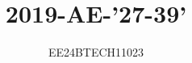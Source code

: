 \documentclass[journal,12pt,onecolumn]{IEEEtran}
\theoremstyle{remark}
\begin{document}

\vspace{3cm}


\title{2019-AE-'27-39'}
\author{EE24BTECH11023}

{\let\newpage\relax\maketitle}

\renewcommand{\thefigure}{\theenumi}
\renewcommand{\thetable}{\theenumi}
\setlength{\intextsep}{10pt} %


\renewcommand{\thetable}{\theenumi}
\end{document}
